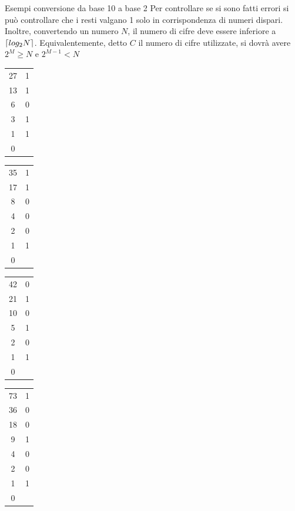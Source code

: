 \documentclass[handout]{beamer}
\DeclarePairedDelimiter{\ceil}{\lceil}{\rceil}
\begin{document}
\begin{frame}{Esempi conversione da base 10 a base 2}
Per controllare se si sono fatti errori si può controllare che i resti valgano 1 solo in corrispondenza di numeri dispari.
Inoltre, convertendo un numero $N$, il numero di cifre deve essere inferiore a $\ceil{log_2N}$. Equivalentemente, detto $C$ il numero di cifre utilizzate, si dovrà avere $2^M \geq N$ e $2^{M-1} < N$

\begin{tabular}{c|c}
	27 & 1\\
	13 & 1\\
	6 & 0\\
	3 & 1\\
	1 & 1\\
	0 &
\end{tabular}
\hskip 1cm
\begin{tabular}{c|c}
	35 & 1\\
	17 & 1\\
	8 & 0\\
	4 & 0\\
	2 & 0\\
	1 & 1\\
	0 & \\
\end{tabular}
\hskip 1cm
\begin{tabular}{c|c}
	42 & 0\\
	21 & 1\\
	10 & 0\\
	5 & 1\\
	2 & 0\\
	1 & 1\\
	0 & \\
\end{tabular}
\hskip 1cm
\begin{tabular}{c|c}
	73 & 1\\
	36 & 0\\
	18 & 0\\
	9 & 1\\
	4 & 0\\
	2 & 0\\
	1 & 1\\
	0 & \\
\end{tabular}
\end{frame}
\end{document}
